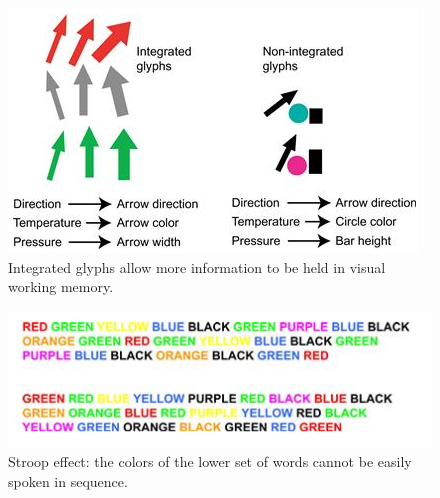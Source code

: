 \begin{mdframed}\begin{multicols}{2}
\begin{figure}[H] \centering
    \includegraphics[width=0.6\linewidth]{integrated_glyphs.png}
    \caption{Integrated glyphs allow more information to be held in
    visual working memory.}
\end{figure}
\begin{figure}[H] \centering
    \includegraphics[width=0.8\linewidth]{stroop_effect.png}
    \caption{Stroop effect: the colors of the lower set of words cannot
    be easily spoken in sequence.}

\end{figure}
\end{multicols}\end{mdframed}





